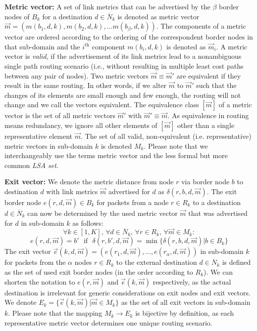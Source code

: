 \documentclass[journal]{IEEEtran}
\begin{document}
\vspace{1mm}\noindent \textbf{Metric vector:} A set of link metrics that can be advertised by the $\beta$ border nodes of $B_k$ for a destination $d\in\overline{N}_k$ is denoted as metric vector $\vec{m} = (m(b_1,d,k), m(b_2,d,k),\ldots m(b_\beta,d,k))$. The components of a metric vector are ordered according to the ordering of the correspondent border nodes in that sub-domain and the $i^\text{th}$ component $m(b_i,d,k)$ is denoted as $\vec{m}_i$. A metric vector is \emph{valid}, if the advertisement of its link metrics lead to a nonambiguous single path routing scenario (i.e., without resulting in multiple least cost paths between any pair of nodes). Two metric vectors $\vec{m}\equiv \vec{m}'$ are equivalent if they result in the same routing. In other words, if we alter $\vec{m}$ to $\vec{m}'$ such that the changes of its elements are small enough and few enough, the routing will not change and we call the vectors equivalent. The equivalence class $[\vec{m}]$ of a metric vector is the set of all metric vectors $\vec{m}'$ with $\vec{m}'\equiv \vec{m}$. As equivalence in routing means redundancy, we ignore all other elements of $[\vec{m}]$ other than a single representative element $\vec{m}$. The set of all valid, non-equivalent (i.e. representative) metric vectors in sub-domain $k$ is denoted $M_k$. Please note that we interchangeably use the terms metric vector and the less formal but more common \emph{LSA set}.

\vspace{1mm}\noindent \textbf{Exit vector:} We denote the metric distance from node $r$ via border node $b$ to destination $d$ with link metrics $\vec{m}$ advertised for $d$ as $\delta (r,b,d,\vec{m})$. The exit border node $e(r,d,\vec{m})\in B_k$ for packets from a node $r\in R_k$ to a destination $d\in\overline{N}_k$ can now be determined by the used metric vector $\vec{m}$ that was advertised for $d$ in sub-domain $k$ as follows:
\[
\forall k\in [1,K], \, \forall d\in\overline{N}_k, \, \forall r\in R_k, \, \forall \vec{m}\in M_k:
\]\[
e(r,d,\vec{m}) = b' \,\,\,\, \text{if} \,\,\,\, \delta (r,b',d,\vec{m}) = \min\{ \delta (r,b,d,\vec{m}) | b\in B_k \}
\]
The exit vector $\vec{e}(k,d,\vec{m})=(e(r_1,d,\vec{m}), \ldots ,e(r_\alpha,d,\vec{m}))$ in sub-domain $k$ for packets from the $\alpha$ nodes $r\in R_k$ to the external destination $d\in\overline{N}_k$ is defined as the set of used exit border nodes (in the order according to $R_k$). We can shorten the notation to $e(r,\vec{m})$ and $\vec{e}(k,\vec{m})$ respectively, as the actual destination is irrelevant for generic considerations on exit nodes and exit vectors. We denote $E_k=\{ \vec{e}(k,\vec{m}) | \vec{m}\in M_k \}$ as the set of all exit vectors in sub-domain $k$. Please note that the mapping $M_k\rightarrow E_k$ is bijective by definition, as each representative metric vector determines one unique routing scenario.
\end{document}
